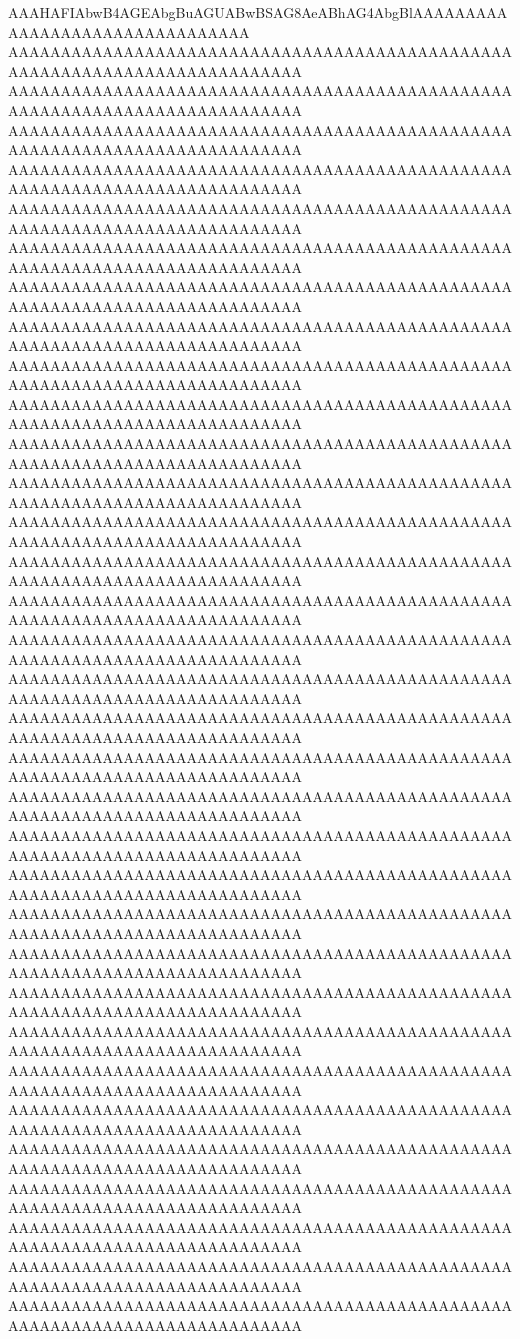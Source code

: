 AAAHAFIAbwB4AGEAbgBuAGUABwBSAG8AeABhAG4AbgBlAAAAAAAAAAAAAAAAAAAAAAAAAAAAAAAA
AAAAAAAAAAAAAAAAAAAAAAAAAAAAAAAAAAAAAAAAAAAAAAAAAAAAAAAAAAAAAAAAAAAAAAAAAAAA
AAAAAAAAAAAAAAAAAAAAAAAAAAAAAAAAAAAAAAAAAAAAAAAAAAAAAAAAAAAAAAAAAAAAAAAAAAAA
AAAAAAAAAAAAAAAAAAAAAAAAAAAAAAAAAAAAAAAAAAAAAAAAAAAAAAAAAAAAAAAAAAAAAAAAAAAA
AAAAAAAAAAAAAAAAAAAAAAAAAAAAAAAAAAAAAAAAAAAAAAAAAAAAAAAAAAAAAAAAAAAAAAAAAAAA
AAAAAAAAAAAAAAAAAAAAAAAAAAAAAAAAAAAAAAAAAAAAAAAAAAAAAAAAAAAAAAAAAAAAAAAAAAAA
AAAAAAAAAAAAAAAAAAAAAAAAAAAAAAAAAAAAAAAAAAAAAAAAAAAAAAAAAAAAAAAAAAAAAAAAAAAA
AAAAAAAAAAAAAAAAAAAAAAAAAAAAAAAAAAAAAAAAAAAAAAAAAAAAAAAAAAAAAAAAAAAAAAAAAAAA
AAAAAAAAAAAAAAAAAAAAAAAAAAAAAAAAAAAAAAAAAAAAAAAAAAAAAAAAAAAAAAAAAAAAAAAAAAAA
AAAAAAAAAAAAAAAAAAAAAAAAAAAAAAAAAAAAAAAAAAAAAAAAAAAAAAAAAAAAAAAAAAAAAAAAAAAA
AAAAAAAAAAAAAAAAAAAAAAAAAAAAAAAAAAAAAAAAAAAAAAAAAAAAAAAAAAAAAAAAAAAAAAAAAAAA
AAAAAAAAAAAAAAAAAAAAAAAAAAAAAAAAAAAAAAAAAAAAAAAAAAAAAAAAAAAAAAAAAAAAAAAAAAAA
AAAAAAAAAAAAAAAAAAAAAAAAAAAAAAAAAAAAAAAAAAAAAAAAAAAAAAAAAAAAAAAAAAAAAAAAAAAA
AAAAAAAAAAAAAAAAAAAAAAAAAAAAAAAAAAAAAAAAAAAAAAAAAAAAAAAAAAAAAAAAAAAAAAAAAAAA
AAAAAAAAAAAAAAAAAAAAAAAAAAAAAAAAAAAAAAAAAAAAAAAAAAAAAAAAAAAAAAAAAAAAAAAAAAAA
AAAAAAAAAAAAAAAAAAAAAAAAAAAAAAAAAAAAAAAAAAAAAAAAAAAAAAAAAAAAAAAAAAAAAAAAAAAA
AAAAAAAAAAAAAAAAAAAAAAAAAAAAAAAAAAAAAAAAAAAAAAAAAAAAAAAAAAAAAAAAAAAAAAAAAAAA
AAAAAAAAAAAAAAAAAAAAAAAAAAAAAAAAAAAAAAAAAAAAAAAAAAAAAAAAAAAAAAAAAAAAAAAAAAAA
AAAAAAAAAAAAAAAAAAAAAAAAAAAAAAAAAAAAAAAAAAAAAAAAAAAAAAAAAAAAAAAAAAAAAAAAAAAA
AAAAAAAAAAAAAAAAAAAAAAAAAAAAAAAAAAAAAAAAAAAAAAAAAAAAAAAAAAAAAAAAAAAAAAAAAAAA
AAAAAAAAAAAAAAAAAAAAAAAAAAAAAAAAAAAAAAAAAAAAAAAAAAAAAAAAAAAAAAAAAAAAAAAAAAAA
AAAAAAAAAAAAAAAAAAAAAAAAAAAAAAAAAAAAAAAAAAAAAAAAAAAAAAAAAAAAAAAAAAAAAAAAAAAA
AAAAAAAAAAAAAAAAAAAAAAAAAAAAAAAAAAAAAAAAAAAAAAAAAAAAAAAAAAAAAAAAAAAAAAAAAAAA
AAAAAAAAAAAAAAAAAAAAAAAAAAAAAAAAAAAAAAAAAAAAAAAAAAAAAAAAAAAAAAAAAAAAAAAAAAAA
AAAAAAAAAAAAAAAAAAAAAAAAAAAAAAAAAAAAAAAAAAAAAAAAAAAAAAAAAAAAAAAAAAAAAAAAAAAA
AAAAAAAAAAAAAAAAAAAAAAAAAAAAAAAAAAAAAAAAAAAAAAAAAAAAAAAAAAAAAAAAAAAAAAAAAAAA
AAAAAAAAAAAAAAAAAAAAAAAAAAAAAAAAAAAAAAAAAAAAAAAAAAAAAAAAAAAAAAAAAAAAAAAAAAAA
AAAAAAAAAAAAAAAAAAAAAAAAAAAAAAAAAAAAAAAAAAAAAAAAAAAAAAAAAAAAAAAAAAAAAAAAAAAA
AAAAAAAAAAAAAAAAAAAAAAAAAAAAAAAAAAAAAAAAAAAAAAAAAAAAAAAAAAAAAAAAAAAAAAAAAAAA
AAAAAAAAAAAAAAAAAAAAAAAAAAAAAAAAAAAAAAAAAAAAAAAAAAAAAAAAAAAAAAAAAAAAAAAAAAAA
AAAAAAAAAAAAAAAAAAAAAAAAAAAAAAAAAAAAAAAAAAAAAAAAAAAAAAAAAAAAAAAAAAAAAAAAAAAA
AAAAAAAAAAAAAAAAAAAAAAAAAAAAAAAAAAAAAAAAAAAAAAAAAAAAAAAAAAAAAAAAAAAAAAAAAAAA
AAAAAAAAAAAAAAAAAAAAAAAAAAAAAAAAAAAAAAAAAAAAAAAAAAAAAAAAAAAAAAAAAAAAAAAAAAAA
AAAAAAAAAAAAAAAAAAAAAAAAAAAAAAAAAAAAAAAAAAAAAAAAAAAAAAAAAAAAAAAAAAAAAAAAAAAA
